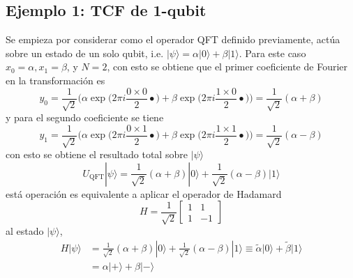 \documentclass[a4paper]{article}
\begin{document}
\subsection{Ejemplo 1: TCF de 1-qubit}
Se empieza por considerar como el operador QFT definido previamente, actúa sobre  un estado de un solo qubit, i.e. $|\psi\rangle=\alpha|0\rangle+\beta |1\rangle$. Para este caso $x_0=\alpha, x_1=\beta$, y $N=2$, con esto se obtiene
que el primer coeficiente de Fourier en la transformación es 
\begin{equation}
y_0=\frac{1}{\sqrt{2}}\Bigg( \alpha \exp\bigg( 2\pi i \frac{0\times 0}{2}{•} \bigg) + \beta \exp\bigg( 2\pi i \frac{1\times 0}{2}{•} \bigg) \Bigg)=\frac{1}{\sqrt{2}}(\alpha+\beta)
\end{equation}
y para el segundo coeficiente se tiene
\begin{equation}
y_1=\frac{1}{\sqrt{2}}\Bigg( \alpha \exp\bigg( 2\pi i \frac{0\times 1}{2}{•} \bigg) + \beta \exp\bigg( 2\pi i \frac{1\times 1}{2}{•} \bigg) \Bigg)=\frac{1}{\sqrt{2}}(\alpha-\beta)
\end{equation}
con esto se obtiene el resultado total sobre $|\psi\rangle$
\begin{equation}
U_{\text{QFT}}|\psi\rangle=\frac{1}{\sqrt{2}}(\alpha+\beta)|0\rangle + \frac{1}{\sqrt{2}}(\alpha-\beta)|1\rangle
\end{equation}
está operación es equivalente a aplicar el operador de Hadamard
\begin{equation}\label{eq::Hadamard_gate}
H=\frac{1}{\sqrt{2}}
\begin{bmatrix}
1&1\\
1&-1
\end{bmatrix}
\end{equation}
al estado $\vert \psi\rangle$, 
\begin{equation}
\begin{aligned}
H\vert\psi\rangle&=\frac{1}{\sqrt{2}}(\alpha+\beta)|0\rangle + \frac{1}{\sqrt{2}}(\alpha-\beta)|1\rangle\equiv \tilde{\alpha}\vert 0\rangle+ \tilde{\beta}\vert 1\rangle\\
&=\alpha \vert + \rangle +\beta \vert - \rangle
\end{aligned}
\end{equation}
\end{document}
